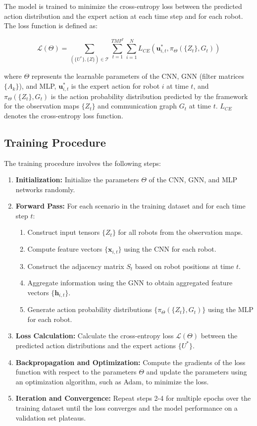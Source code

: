 The model is trained to minimize the cross-entropy loss between the predicted action distribution and the expert action at each time step and for each robot. The loss function is defined as:

\[
\mathcal{L}(\Theta) = \sum_{(\{U^*\}, \{Z\}) \in \mathcal{T}} \sum_{t=1}^{TMP^*} \sum_{i=1}^{N} L_{CE}(\mathbf{u}^*_{i,t}, \pi_{\Theta}(\{Z_t\}, G_t))
\]

where $\Theta$ represents the learnable parameters of the CNN, GNN (filter matrices $\{A_k\}$), and MLP, $\mathbf{u}^*_{i,t}$ is the expert action for robot $i$ at time $t$, and $\pi_{\Theta}(\{Z_t\}, G_t)$ is the action probability distribution predicted by the framework for the observation maps $\{Z_t\}$ and communication graph $G_t$ at time $t$. $L_{CE}$ denotes the cross-entropy loss function.

\subsection{Training Procedure}

The training procedure involves the following steps:

\begin{enumerate}
    \item \textbf{Initialization:} Initialize the parameters $\Theta$ of the CNN, GNN, and MLP networks randomly.
    \item \textbf{Forward Pass:} For each scenario in the training dataset and for each time step $t$:
        \begin{enumerate}
            \item Construct input tensors $\{Z_t\}$ for all robots from the observation maps.
            \item Compute feature vectors $\{\mathbf{x}_{i,t}\}$ using the CNN for each robot.
            \item Construct the adjacency matrix $S_t$ based on robot positions at time $t$.
            \item Aggregate information using the GNN to obtain aggregated feature vectors $\{\mathbf{h}_{i,t}\}$.
            \item Generate action probability distributions $\{\pi_{\Theta}(\{Z_t\}, G_t)\}$ using the MLP for each robot.
        \end{enumerate}
    \item \textbf{Loss Calculation:} Calculate the cross-entropy loss $\mathcal{L}(\Theta)$ between the predicted action distributions and the expert actions $\{U^*\}$.
    \item \textbf{Backpropagation and Optimization:} Compute the gradients of the loss function with respect to the parameters $\Theta$ and update the parameters using an optimization algorithm, such as Adam, to minimize the loss.
    \item \textbf{Iteration and Convergence:} Repeat steps 2-4 for multiple epochs over the training dataset until the loss converges and the model performance on a validation set plateaus.
\end{enumerate}

